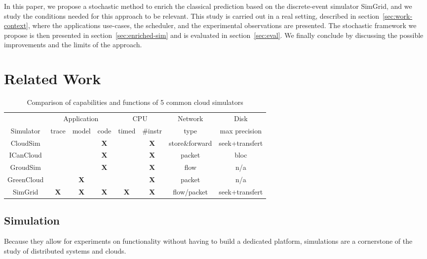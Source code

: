 \documentclass[10pt,conference,compsocconf]{IEEEtran}
\begin{document}
In this paper, we propose a stochastic method to enrich the classical prediction
based  on the  discrete-event simulator  SimGrid,  and we  study the  conditions
needed for  this approach to be  relevant. This study  is carried out in  a real
setting,  described in  section~\ref{sec:work-context},  where the  applications
use-cases, the scheduler, and the  experimental observations are presented.  The
stochastic     framework     we     propose     is     then     presented     in
section~\ref{sec:enriched-sim}  and is  evaluated in  section~\ref{sec:eval}. We
finally conclude by  discussing the possible improvements and the  limits of the
approach.


\section{Related Work}
\begin{table}
	\centering
	\caption{Comparison of capabilities and functions of 5 common cloud
	simulators}
	\label{tab:simcmp}
\begin{tabular}{|c||c|c|c||c|c|c|c|}
	\hline
	& \multicolumn{3}{c||}{Application} &
	\multicolumn{2}{c|}{CPU}&Network&Disk\\
	\cline{2-8}
	Simulator &trace%
                  &model%
                  &code%
                  &timed%
                  &\#instr%
		  &type 
		  &max precision\\
	\hline
	CloudSim\cite{cloudsim} & & & \bf X &&\bf
	X&store\&forward&seek+transfert\\ \hline
	ICanCloud\cite{icancloud} & & & \bf X &&\bf X&packet& bloc \\ \hline
	GroudSim\cite{groudsim} & & & \bf X &&\bf X&flow& n/a\\\hline
	GreenCloud\cite{greencloud} & & \bf X &&&\bf X&packet& n/a\\ \hline
	SimGrid\cite{simgrid}& \bf X & \bf X & \bf X &\bf X&\bf X& flow/packet &
	seek+transfert \\
	\hline
\end{tabular}
\end{table}



\subsection{Simulation}

Because they allow for experiments on functionality without having to build a
dedicated platform, simulations are a cornerstone of the study of distributed
systems and clouds.  
\end{document}

